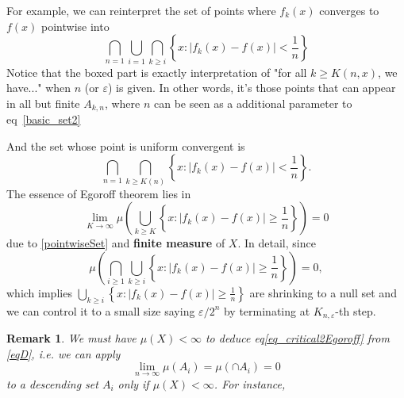 \documentclass[dvipsnames]{article}
\numberwithin{equation}{section}
\newtheorem{Remark}[Theorem]{Remark}
\begin{document}
For example, we can reinterpret the set of points where $f_{k}(x)$ converges to $f(x)$ pointwise into
\begin{equation}
    \label{pointwiseSet}
    \bigcap_{n=1} \boxed{\bigcup_{i=1} \bigcap_{k\geq i} \left\{x: |f_{k}(x)-f(x)|<\frac{1}{n}\right\}}
\end{equation}
Notice that the boxed part is exactly interpretation of "for all $k\geq K(n, x)$, we have..." when $n$ (or $\varepsilon$) is given. In other words, it's those points that can appear in all but finite $A_{k,n}$, where $n$ can be seen as a additional parameter to eq~\eqref{basic_set2} 

And the set whose point is uniform convergent is 
\begin{equation}
\label{uniformSet}
    \bigcap_{n=1} \boxed{\bigcap_{k\geq K(n)} \left\{x: |f_{k}(x)-f(x)|<\frac{1}{n}\right\}}.
\end{equation}
The essence of Egoroff theorem lies in 
\begin{equation}
\label{eq_critical2Egoroff}
    \lim_{K\to \infty} \mu\left(\bigcup_{k\geq K} \left\{x: |f_{k}(x)-f(x)|\geq \frac{1}{n}\right\}\right) = 0
\end{equation}
due to \eqref{pointwiseSet} and \textbf{finite measure} of $X$. In detail, since 
\begin{equation}
    \label{eqD}
    \mu\left(\bigcap _{i\geq 1} \bigcup_{k\geq i} \left\{x: |f_{k}(x)-f(x)|\geq \frac{1}{n}\right\}\right) = 0,
\end{equation}
which implies $\bigcup_{k\geq i} \left\{x: |f_{k}(x)-f(x)|\geq \frac{1}{n}\right\}$ are shrinking to a null set and we can control it to a small size saying $\varepsilon/2^n$ by terminating at $K_{n, \varepsilon}$-th step.

\begin{Remark}
    We must have $\mu(X)<\infty$ to deduce eq\eqref{eq_critical2Egoroff} from \eqref{eqD}, i.e. we can apply
    $$
    \lim_{n\to\infty} \mu(A_{i}) =\mu(\cap A_{i}) = 0
    $$
    to a descending set $A_{i}$ only if $\mu(X)<\infty$. For instance,
    
    \vspace{0.4cm}
    
    \vspace{0.4cm}
\end{Remark}
\end{document}

